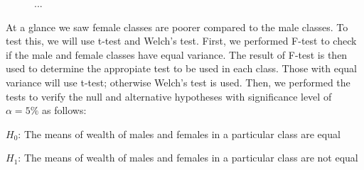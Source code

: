 \begin{figure}[htp]
\centering 
{}


\caption{...}
\label{fig:Histogram of Wealth}

\end{figure}

At a glance we saw female classes are poorer compared to the male classes. To test this, we will use t-test and Welch's test. First, we performed F-test to check if the male and female classes have equal variance. The result of F-test is then used to determine the appropiate test to be used in each class. Those with equal variance will use t-test; otherwise Welch's test is used. Then, we performed the tests to verify the null and alternative hypotheses with significance level of \(\alpha=5\%\) as follows:

\(H_0\): The means of wealth of males and females in a particular class are equal

\(H_1\): The means of wealth of males and females in a particular class are not equal

